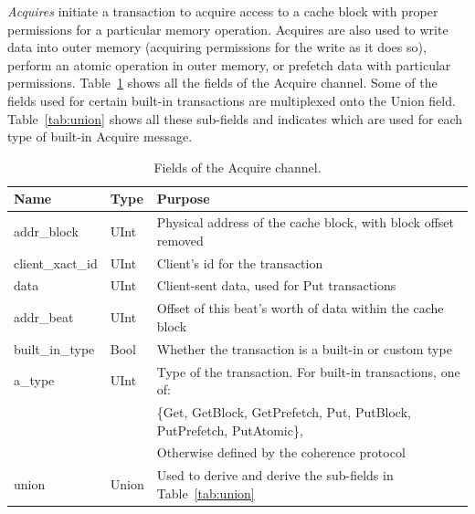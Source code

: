 \emph{Acquires} initiate a transaction to acquire access to a cache block with proper permissions for a particular memory operation.
Acquires are also used to write data into outer memory (acquiring permissions for the write as it does so), perform an atomic operation in outer memory, or prefetch data with particular permissions.
Table~\ref{tab:acquire} shows all the fields of the Acquire channel.
Some of the fields used for certain built-in transactions are multiplexed onto the Union field.
Table~\ref{tab:union} shows all these sub-fields and indicates which are used for each type
of built-in Acquire message.

\begin{table}[p]
\begin{center}
\begin{tabular}{|l|l|l|}
    \hline
    Name & Type & Purpose \\ \hline \hline
addr\_block & UInt & Physical address of the cache block, with block offset removed \\ \hline
client\_xact\_id & UInt & Client's id for the transaction \\ \hline
data & UInt & Client-sent data, used for Put transactions \\ \hline
addr\_beat & UInt & Offset of this beat's worth of data within the cache block \\ \hline
built\_in\_type & Bool & Whether the transaction is a built-in or custom type \\ \hline
a\_type & UInt & Type of the transaction. For built-in transactions, one of: \\
        &      & \{Get, GetBlock, GetPrefetch, Put, PutBlock, PutPrefetch, PutAtomic\}, \\
        &      &  Otherwise defined by the coherence protocol \\ \hline
union & Union & Used to derive and derive the sub-fields in Table~\ref{tab:union} \\ \hline
\end{tabular}
\end{center}
\caption{Fields of the Acquire channel.}
\label{tab:acquire}
\end{table}

